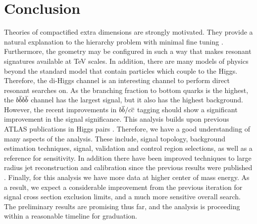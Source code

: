 \documentclass[12pt]{article}
\begin{document}
\section{Conclusion}

Theories of compactified extra dimensions are strongly
motivated. They provide a natural explanation to the hierarchy problem with
minimal fine tuning \cite{RandallSundrumOriginal, bsm}. Furthermore, the
geometry may be configured in such a way that makes resonant signatures
available at TeV scales. In addition, there are many models of physics beyond
the standard model that contain particles which couple to the Higgs. Therefore,
the di-Higgs channel is an interesting channel to perform direct resonant
searches on. As the branching fraction to bottom quarks is the highest, the
$b\overline{b}b\overline{b}$ channel has the largest signal, but it also has the highest
background. However, the recent improvements in $b\overline{b}/c\overline{c}$ tagging should
show a significant improvement in the signal significance. This analysis builds
upon previous ATLAS publications in Higgs pairs \cite{atlas_resonant_2022,
atlas_hhbbbb_vbf}. Therefore, we have a good understanding of many aspects of
the analysis. These include, signal topology, background estimation techniques,
signal, validation and control region selections, as well as a reference for
sensitivity. In addition there have been improved techniques to large radius jet
reconstruction and calibration since the previous results were published
\cite{large_r_jet}. Finally, for this analysis we have more data at higher
center of mass energy. As a result, we expect a considerable improvement from
the previous iteration for signal cross section exclusion limits, and a much
more sensitive overall search. The preliminary results are promising thus far,
and the analysis is proceeding within a reasonable timeline for graduation.


\newpage

% 


\newpage

\appendix
\end{document}

